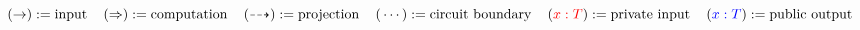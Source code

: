 \documentclass{article}
\begin{document}
\begin{center}
\end{center}

\vspace{2em}

\[
    (\rightarrow) := \text{input}
    \,\,\,\,\,\,\,
    (\Rightarrow) := \text{computation}
    \,\,\,\,\,\,\,
    (\dasharrow) := \text{projection}
    \,\,\,\,\,\,\,
    (\,\cdots\,) := \text{circuit boundary}
    \,\,\,\,\,\,\,
    ({\color{red}{x : T}}) := \text{private input}
    \,\,\,\,\,\,\,
    ({\color{blue}{x : T}}) := \text{public output}
\]
\end{document}
